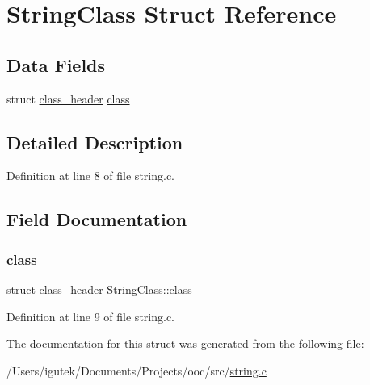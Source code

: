 \hypertarget{structStringClass}{}\section{String\+Class Struct Reference}
\label{structStringClass}
\subsection*{Data Fields}
\begin{DoxyCompactItemize}
\item 
struct \mbox{\hyperlink{structclass__header}{class\+\_\+header}} \mbox{\hyperlink{structStringClass_a8c8d1fa459fe14f1514f9b06982710d2}{class}}
\end{DoxyCompactItemize}


\subsection{Detailed Description}


Definition at line 8 of file string.\+c.



\subsection{Field Documentation}
\mbox{\label{structStringClass_a8c8d1fa459fe14f1514f9b06982710d2}} 
\subsubsection{\texorpdfstring{class}{class}}
{\footnotesize\ttfamily struct \mbox{\hyperlink{structclass__header}{class\+\_\+header}} String\+Class\+::class}



Definition at line 9 of file string.\+c.



The documentation for this struct was generated from the following file\+:\begin{DoxyCompactItemize}
\item 
/\+Users/igutek/\+Documents/\+Projects/ooc/src/\mbox{\hyperlink{string_8c}{string.\+c}}\end{DoxyCompactItemize}
